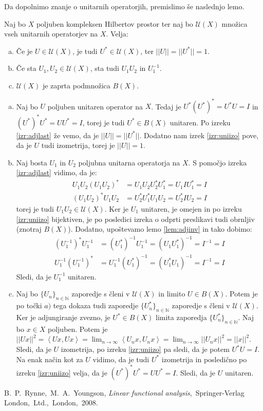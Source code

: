 \documentclass[mat2]{matdelo}
\newcommand{\N}{\mathbb{N}}
\newcommand{\abs}[1]{\ensuremath{\lvert #1 \rvert}}
\newcommand{\norm}[1]{\abs{\abs{#1}}}
\newcommand{\Sp}[2]{\ensuremath{\left<#1, #2\right>}}
\begin{document}
			Da dopolnimo znanje o unitarnih operatorjih, premislimo še naslednjo lemo.
			\begin{lema}
				\label{lem:unitarset}
				Naj bo $X$ poljuben kompleksen Hilbertov prostor ter naj bo $\mathcal{U}(X)$ množica vseh unitarnih operatorjev na $X$. Velja:
				\begin{enumerate}[a)]
					\item Če je $U\in \mathcal{U}(X)$, je tudi $U^*\in \mathcal{U}(X)$, ter $\norm{U} = \norm{U^*} = 1$.
					\item Če sta $U_1, U_2 \in \mathcal{U}(X)$, sta tudi $U_1U_2$ in $U_1^{-1}$.
					\item $\mathcal{U}(X)$ je zaprta podmnožica $B(X)$.
				\end{enumerate}
			\end{lema}
			\begin{dokaz}
				\begin{enumerate}[a)]
					\item Naj bo $U$ poljuben unitaren operator na $X$. Tedaj je $U^*(U^*)^* = U^*U = I$ in $(U^*)^*U^* = UU^* = I$, torej je tudi $U^*\in B(X)$ unitaren. Po izreku \ref{izr:adjlast} že vemo, da je $\norm{U} = \norm{U^*}$. Dodatno nam izrek \ref{izr:uniizo} pove, da je $U$ tudi izometrija, torej je $\norm{U} = 1$.
					\item Naj bosta $U_1$ in $U_2$ poljubna unitarna operatorja na $X$. S pomočjo izreka \ref{izr:adjlast} vidimo, da je: \begin{align*}
						U_1U_2(U_1U_2)^* &= U_1U_2U_2^*U_1^* = U_1IU_1^* = I \\
						(U_1U_2)^*U_1U_2 &= U_2^*U_1^*U_1U_2 = U_2^*IU_2 = I 
					\end{align*} torej je tudi $U_1U_2 \in \mathcal{U}(X)$.
					Ker je $U_1$ unitaren, je omejen in po izreku \ref{izr:uniizo} bijektiven, je po posledici izreka o odprti preslikavi tudi obrnljiv (znotraj $B(X)$). Dodatno, upoštevamo lemo \ref{lem:adjinv} in tako dobimo: \begin{align*}
						(U_1^{-1})^*U_1^{-1} &= (U_1^*)^{-1}U_1^{-1} = (U_1U_1^*)^{-1} = I^{-1} = I \\
						U_1^{-1}(U_1^{-1})^* &= U_1^{-1}(U_1^*)^{-1} = (U_1^*U_1)^{-1} = I^{-1} = I
					\end{align*}
					Sledi, da je $U_1^{-1}$ unitaren.
					\item Naj bo $\{U_n\}_{n\in\N}$ zaporedje s členi v $\mathcal{U}(X)$ in limito $U \in B(X)$. Potem je po točki $a)$ tega dokaza tudi zaporedje $\{U_n^*\}_{n\in\N}$ zaporedje s členi v $\mathcal{U}(X)$. Ker je adjungiranje zvezno, je $U^*\in B(X)$ limita zaporedja $\{U_n^*\}_{n\in\N}$. Naj bo $x\in X$ poljuben. Potem je $\norm{Ux}^2 = \Sp{Ux}{Ux} = \lim_{n\to\infty}\Sp{U_nx}{U_nx} = \lim_{n\to\infty}\norm{U_nx}^2 = \norm{x}^2$. Sledi, da je $U$ izometrija, po izreku \ref{izr:uniizo} pa sledi, da je potem $U^*U = I$. Na enak način kot za $U$ vidimo, da je tudi $U^*$ izometrija in posledično po izreku \ref{izr:uniizo} velja, da je $(U^*)^*U^* = UU^* = I$. Sledi, da je $U$ unitaren.
				\end{enumerate}
			\end{dokaz}
	\begin{thebibliography}{99}
		 B.~P.~Rynne,~M.~A.~Youngson, \emph{Linear functional analysis},~Springer-Verlag London,~Ltd.,~London,~2008.
	\end{thebibliography}
\end{document}
